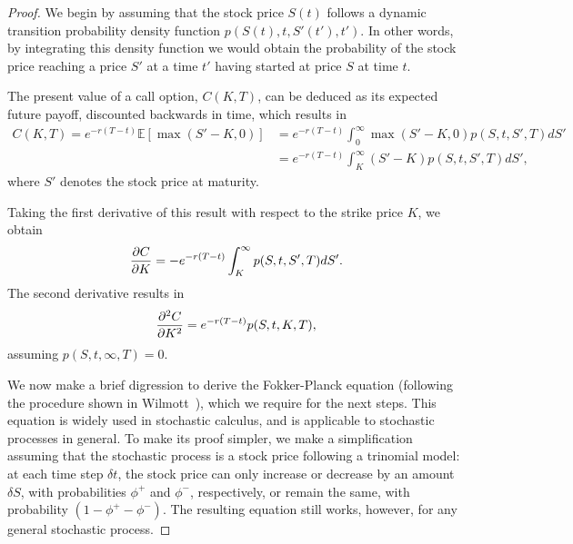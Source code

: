 \begin{proof}

We begin by assuming that the stock price $S(t)$ follows a dynamic transition probability density function $p(S(t),t,S'(t'),t')$. In other words, by integrating this density function we would obtain the probability of the stock price reaching a price $S'$ at a time $t'$ having started at price $S$ at time $t$.

The present value of a call option, $C(K,T)$, can be deduced as its expected future payoff, discounted backwards in time, which results in
\begin{equation}
\begin{split}\label{deriv0}
C(K,T)=e^{-r(T-t)}\mathbb{E}\left[\max\left(S'-K,0\right)\right]&=e^{-r(T-t)}\int_0^\infty\max\left(S'-K,0\right)p(S,t,S',T)dS'\\
&=e^{-r(T-t)}\int_K^\infty(S'-K)p(S,t,S',T)dS',
\end{split}
\end{equation}
\noindent where $S'$ denotes the stock price at maturity.

Taking the first derivative of this result with respect to the strike price $K$, we obtain
\begin{equation}\label{dcdk}
\pdv{C}{K}=-e^{-r(T-t)}\int_K^\infty p(S,t,S',T)dS'.
\end{equation}
The second derivative results in
\begin{equation}\label{d2cdk2}
\pdv{^2C}{K^2}=e^{-r(T-t)}p(S,t,K,T),
\end{equation}
\noindent assuming $p(S,t,\infty,T)=0$.

We now make a brief digression to derive the Fokker-Planck equation (following the procedure shown in Wilmott~\citep{Wilmott3}), which we require for the next steps. This equation is widely used in stochastic calculus, and is applicable to stochastic processes in general.
To make its proof simpler, we make a simplification assuming that the stochastic process is a stock price following a trinomial model: at each time step $\delta t$, the stock price can only increase or decrease by an amount $\delta S$, with probabilities $\phi^+$ and $\phi^-$, respectively, or remain the same, with probability $(1-\phi^+-\phi^-)$. The resulting equation still works, however, for any general stochastic process.



\end{proof}
